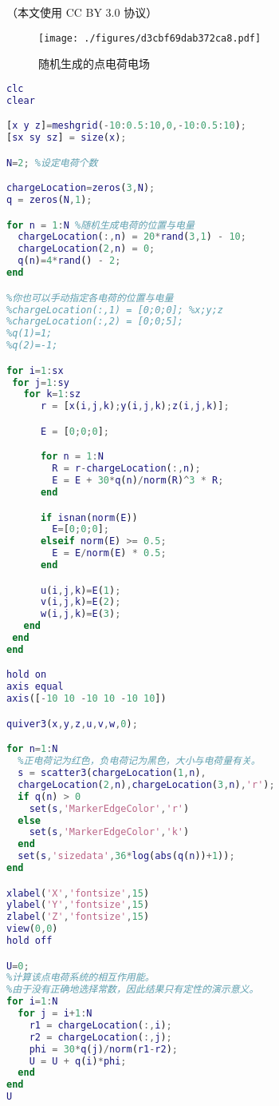 

（本文使用 CC BY 3.0 协议）
\begin{figure}[ht]
\centering
\texttt{[image: ./figures/d3cbf69dab372ca8.pdf]}
\caption{随机生成的点电荷电场} \label{fig_MLTEPD_1}
\end{figure}
\begin{lstlisting}[language=matlab]
clc
clear

[x y z]=meshgrid(-10:0.5:10,0,-10:0.5:10);
[sx sy sz] = size(x);

N=2; %设定电荷个数

chargeLocation=zeros(3,N);
q = zeros(N,1);

for n = 1:N %随机生成电荷的位置与电量
  chargeLocation(:,n) = 20*rand(3,1) - 10;
  chargeLocation(2,n) = 0;
  q(n)=4*rand() - 2;
end

%你也可以手动指定各电荷的位置与电量
%chargeLocation(:,1) = [0;0;0]; %x;y;z
%chargeLocation(:,2) = [0;0;5];
%q(1)=1;
%q(2)=-1;

for i=1:sx
 for j=1:sy
   for k=1:sz
      r = [x(i,j,k);y(i,j,k);z(i,j,k)];

      E = [0;0;0];

      for n = 1:N
        R = r-chargeLocation(:,n);
        E = E + 30*q(n)/norm(R)^3 * R;
      end

      if isnan(norm(E))
        E=[0;0;0];
      elseif norm(E) >= 0.5;
        E = E/norm(E) * 0.5;
      end

      u(i,j,k)=E(1);
      v(i,j,k)=E(2);
      w(i,j,k)=E(3);
   end
 end
end

hold on
axis equal
axis([-10 10 -10 10 -10 10])

quiver3(x,y,z,u,v,w,0);

for n=1:N
  %正电荷记为红色，负电荷记为黑色，大小与电荷量有关。
  s = scatter3(chargeLocation(1,n),
  chargeLocation(2,n),chargeLocation(3,n),'r');
  if q(n) > 0 
    set(s,'MarkerEdgeColor','r')
  else
    set(s,'MarkerEdgeColor','k')
  end
  set(s,'sizedata',36*log(abs(q(n))+1));
end

xlabel('X','fontsize',15)
ylabel('Y','fontsize',15)
zlabel('Z','fontsize',15)
view(0,0)
hold off

U=0; 
%计算该点电荷系统的相互作用能。
%由于没有正确地选择常数，因此结果只有定性的演示意义。
for i=1:N
  for j = i+1:N
    r1 = chargeLocation(:,i);
    r2 = chargeLocation(:,j);
    phi = 30*q(j)/norm(r1-r2);
    U = U + q(i)*phi;
  end
end
U
\end{lstlisting}
